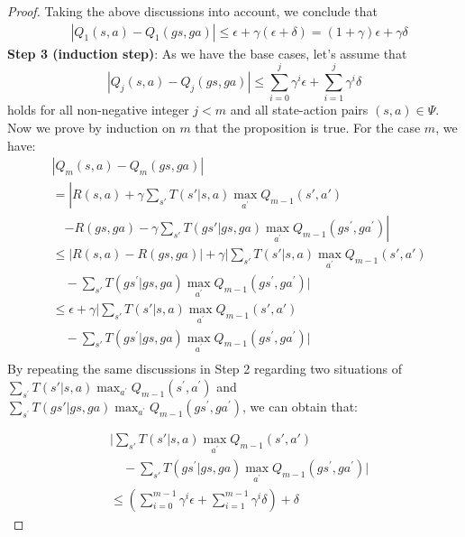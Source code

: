 \documentclass[letterpaper]{article} %
\theoremstyle{definition}
\begin{document}
\begin{proof}
Taking the above discussions into account, we conclude that
{\scriptsize
\begin{equation*}
\begin{aligned}
& \left|Q_1(s, a) - Q_1(gs, ga)\right| \leq \epsilon +\gamma (\epsilon + \delta) = (1+\gamma)\epsilon+\gamma \delta
\end{aligned}
\end{equation*}}
\noindent
\textbf{Step 3 (induction step)}: As we have the base cases, let's assume that
{\scriptsize
\begin{equation*}
|Q_j(s, a) - Q_j(gs, ga)| \leq \sum_{i=0}^{j} \gamma^i\epsilon +\sum_{i=1}^{j}\gamma^i \delta
\end{equation*}}
holds for all non-negative integer $j<m$ and all state-action pairs $(s,a) \in\Psi$. Now we prove by induction on $m$ that the proposition is true. For the case $m$, we have: 
{\scriptsize
\begin{equation*}
\begin{aligned}
& \left|Q_m(s, a) - Q_m(gs, ga)\right| \\
& = \left| R(s, a) + \gamma \sum_{s'} T(s'|s, a)  \max_{a^{\prime}} Q_{m-1}(s', a') \right.\\
& \quad \left. - R(gs, ga) - \gamma \sum_{s'} T(gs'|gs, ga)  \max_{a^{\prime}} Q_{m-1}(gs^{\prime}, ga^{\prime}) \right| \\
& \leq \left| R(s, a) -  R(gs, ga) \right| +\gamma \biggl |\sum_{s'} T(s'|s, a) \max_{a^{\prime}} Q_{m-1}(s', a')  \\
& \quad - \sum_{s'} T(gs^{\prime}|gs, ga) \max_{a^{\prime}} Q_{m-1}(gs^{\prime}, ga^{\prime}) \biggl | \\
& \leq \epsilon + \gamma \biggl |\sum_{s'} T(s'|s, a) \max_{a^{\prime}} Q_{m-1}(s', a')  \\
& \quad - \sum_{s'} T(gs^{\prime}|gs, ga) \max_{a^{\prime}} Q_{m-1}(gs^{\prime}, ga^{\prime}) \biggl | \\
\end{aligned}
\end{equation*}}
By repeating the same discussions in Step 2 regarding two situations of 
$\sum_{s^{\prime}} T(s'|s, a)  \max_{a^{\prime}} Q_{m-1}(s^{\prime}, a^{\prime})$  and $\sum_{s^{\prime}} T(gs'|gs, ga)  \max_{a^{\prime}} Q_{m-1}(gs^{\prime}, ga^{\prime})$, we can obtain that:


{\scriptsize
\begin{equation*}
\begin{aligned}
&  \biggl |\sum_{s'} T(s'|s, a) \max_{a^{\prime}} Q_{m-1}(s', a')  \\
& \quad - \sum_{s'} T(gs^{\prime}|gs, ga) \max_{a^{\prime}} Q_{m-1}(gs^{\prime}, ga^{\prime}) \biggl | \\
& \leq \left( \sum_{i=0}^{m-1} \gamma^i\epsilon + \sum_{i=1}^{m-1}\gamma^i \delta \right) + \delta
\end{aligned}
\end{equation*}}


\end{proof}
\end{document}

